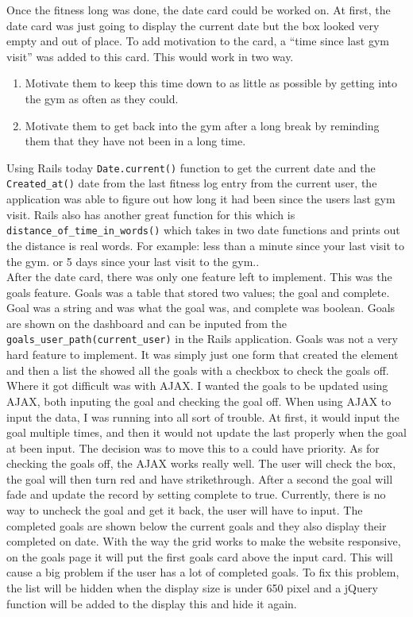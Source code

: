 Once the fitness long was done, the date card could be worked on. At first, the date card was just going to display the current date but the box looked very empty and out of place. To add motivation to the card, a ``time since last gym visit'' was added to this card. This would work in two way.

\begin{enumerate}
\item Motivate them to keep this time down to as little as possible by getting into the gym as often as they could.
\item Motivate them to get back into the gym after a long break by reminding them that they have not been in a long time.
\end{enumerate}

Using Rails today \lstinline{Date.current()} function to get the current date and the \lstinline{Created_at()} date from the last fitness log entry from the current user, the application was able to figure out how long it had been since the users last gym visit. Rails also has another great function for this which is \lstinline{distance_of_time_in_words()} which takes in two date functions and prints out the distance is real words. For example: less than a minute since your last visit to the gym. or 5 days since your last visit to the gym..\\

After the date card, there was only one feature left to implement. This was the goals feature. Goals was a table that stored two values; the goal and complete. Goal was a string and was what the goal was, and complete was boolean. Goals are shown on the dashboard and can be inputed from the \lstinline{goals_user_path(current_user)} in the Rails application. Goals was not a very hard feature to implement. It was simply just one form that created the element and then a list the showed all the goals with a checkbox to check the goals off. Where it got difficult was with AJAX. I wanted the goals to be updated using AJAX, both inputing the goal and checking the goal off. When using AJAX to input the data, I was running into all sort of trouble. At first, it would input the goal multiple times, and then it would not update the last properly when the goal at been input. The decision was to move this to a could have priority. As for checking the goals off, the AJAX works really well. The user will check the box, the goal will then turn red and have strikethrough. After a second the goal will fade and update the record by setting complete to true. Currently, there is no way to uncheck the goal and get it back, the user will have to input. The completed goals are shown below the current goals and they also display their completed on date. With the way the grid works to make the website responsive, on the goals page it will put the first goals card above the input card. This will cause a big problem if the user has a lot of completed goals. To fix this problem, the list will be hidden when the display size is under 650 pixel and a jQuery function will be added to the display this and hide it again.\\


